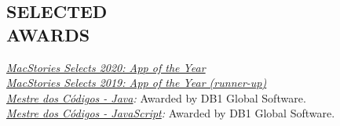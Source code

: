 \documentclass[line,margin]{res}
\begin{document}
\begin{resume}
\section{SELECTED \\ AWARDS}             
  {\sl \href{https://www.macstories.net/stories/macstories-selects-2020-recognizing-the-best-apps-of-the-year/#app-of-the-year}{MacStories Selects 2020: App of the Year}}\\
  {\sl \href{https://www.macstories.net/stories/macstories-selects-2019-recognizing-the-best-apps-of-the-year/#app-of-the-year-runner-up}{MacStories Selects 2019: App of the Year (runner-up)}}\\
  {\sl \href{https://mestredoscodigos.com.br/primeira-entrega-dos-pins-do-mestre-dos-codigos}{Mestre dos C\'odigos - Java}:} Awarded by DB1 Global Software.\\
  {\sl \href{https://mestredoscodigos.com.br/primeira-entrega-dos-pins-do-mestre-dos-codigos}{Mestre dos C\'odigos - JavaScript}:} Awarded by DB1 Global Software.\\
 

\end{resume}
\end{document}
